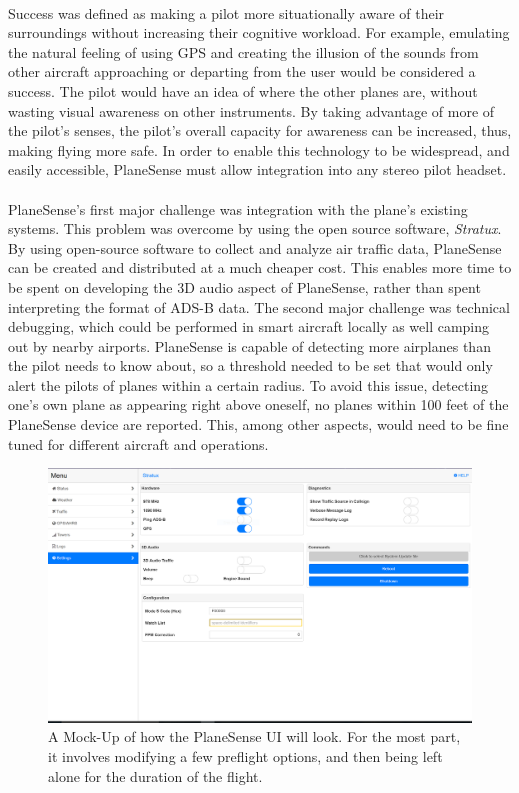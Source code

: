 \paragraph{}
Success was defined as making a pilot more situationally aware of their surroundings without increasing their cognitive workload.  For example, emulating the natural feeling of using GPS and creating the illusion of the sounds from other aircraft approaching or departing from the user would be considered a success.  The pilot would have an idea of where the other planes are, without wasting visual awareness on other instruments. By taking advantage of more of the pilot's senses, the pilot's overall capacity for awareness can be increased, thus, making flying more safe. In order to enable this technology to be widespread, and easily accessible, PlaneSense must allow integration into any stereo pilot headset. 


\paragraph{} 
PlaneSense's first major challenge was integration with the plane's existing systems. This problem was overcome by using the open source software, \textit{Stratux}.
By using open-source software to collect and analyze air traffic data, PlaneSense can be created and distributed at a much cheaper cost.
This enables more time to be spent on developing the 3D audio aspect of PlaneSense, rather than spent interpreting the format of ADS-B data.
The second major challenge was technical debugging, which could be performed in smart aircraft locally as well camping out by nearby airports.  PlaneSense is capable of detecting more airplanes than the pilot needs to know about, so a threshold needed to be set that would only alert the pilots of planes within a certain radius.  To avoid this issue, detecting one's own plane as appearing right above oneself, no planes within 100 feet of the PlaneSense device are reported.  This, among other aspects, would need to be fine tuned for different aircraft and operations. 

       \begin{figure}
         \includegraphics[width=\linewidth]{./sample_ui.png}
         \caption{A Mock-Up of how the PlaneSense UI will look. For the most part, it involves modifying a few preflight
           options, and then being left alone for the duration of the flight.}
         \label{fig:p1}
       \end{figure}

